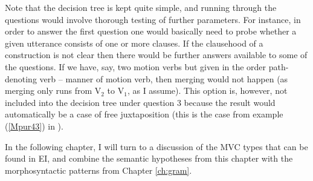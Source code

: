 Note that the decision tree is kept quite simple, and running through the questions would involve thorough testing of further parameters. For instance, in order to answer the first question one would basically need to probe whether a given utterance consists of one or more clauses. If the clausehood of a construction is not clear then there would be further answers available to some of the questions. If we have, say, two motion verbs but given in the order path-denoting verb -- manner of motion verb, then merging would not happen (as merging only runs from V$_2$ to V$_1$, as I assume). This option is, however, not included into the decision tree under question 3 because the result would automatically be a case of free juxtaposition (this is the  case from example (\ref{Mpur43}) in ).

In the following chapter, I will turn to a discussion of the MVC types that can be found in EI, and combine the semantic hypotheses from this chapter with the morphosyntactic patterns from Chapter \ref{ch:gram}.
